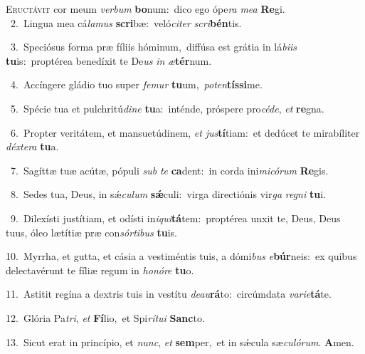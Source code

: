 \lettrine{\initial\textcolor{\initialcolor}{E}}{ructávit} cor meum \textit{ver}\-\textit{bum} \textbf{bo}\-num:~\star dico ego ópe\textit{ra} \textit{me}\-\textit{a} \textbf{Re}\-gi.\\
{\numbfont\textcolor{\numbcolor}{~2.}}~Lingua mea cá\-\textit{la}\-\textit{mus} \textbf{scri}\-bæ:~\star veló\-\textit{ci}\-\textit{ter} \textit{scri}\-\textbf{bén}tis.\par
{\numbfont\textcolor{\numbcolor}{~3.}}~Speciósus forma præ fíliis hóminum,~\dagger diffúsa est grátia in lá\-\textit{bi}\-\textit{is} \textbf{tu}\-is:~\star proptérea benedíxit te De\textit{us} \textit{in} \textit{æ}\-\textbf{tér}num.\par
{\numbfont\textcolor{\numbcolor}{~4.}}~Accíngere gládio tuo super \textit{fe}\-\textit{mur} \textbf{tu}\-um,~\star \textit{pot}\-\textit{en}\textbf{tís}\textbf{si}me.\par
{\numbfont\textcolor{\numbcolor}{~5.}}~Spécie tua et pulchritú\-\textit{di}\-\textit{ne} \textbf{tu}\-a:~\star inténde, próspere pro\-\textit{cé}\-\textit{de}, \textit{et} \textbf{re}\-gna.\par
{\numbfont\textcolor{\numbcolor}{~6.}}~Propter veritátem, et mansuetúdinem, \textit{et} \textit{jus}\-\textbf{tí}tiam:~\star et dedúcet te mirabíliter \textit{déx}\-\textit{te}\textit{ra} \textbf{tu}\-a.\par
{\numbfont\textcolor{\numbcolor}{~7.}}~Sagíttæ tuæ acútæ, pópuli \textit{sub} \textit{te} \textbf{ca}\-dent:~\star in corda ini\-\textit{mi}\-\textit{có}\textit{rum} \textbf{Re}\-gis.\par
{\numbfont\textcolor{\numbcolor}{~8.}}~Sedes tua, Deus, in sǽ\-\textit{cu}\-\textit{lum} \textbf{sǽ}\-culi:~\star virga directiónis vir\textit{ga} \textit{re}\-\textit{gni} \textbf{tu}\-i.\par
{\numbfont\textcolor{\numbcolor}{~9.}}~Dilexísti justítiam, et odísti in\-\textit{i}\-\textit{qui}\textbf{tá}tem:~\star proptérea unxit te, Deus, Deus tuus, óleo lætítiæ præ con\-\textit{sór}\-\textit{ti}\textit{bus} \textbf{tu}\-is.\par
{\numbfont\textcolor{\numbcolor}{10.}}~Myrrha, et gutta, et cásia a vestiméntis tuis, a dómi\textit{bus} \textit{e}\-\textbf{búr}neis:~\star ex quibus delectavérunt te fíliæ regum in \textit{ho}\-\textit{nó}\textit{re} \textbf{tu}\-o.\par
{\numbfont\textcolor{\numbcolor}{11.}}~Astitit regína a dextris tuis in vestítu \textit{de}\-\textit{au}\textbf{rá}to:~\star circúmdata \textit{va}\-\textit{ri}\textit{e}\textbf{tá}te.\par
{\numbfont\textcolor{\numbcolor}{12.}}~Glória Pa\-\textit{tri}\-, \textit{et} \textbf{Fí}\-lio,~\star et Spi\-\textit{rí}\-\textit{tu}\textit{i} \textbf{Sanc}\-to.\par
{\numbfont\textcolor{\numbcolor}{13.}}~Sicut erat in princípio, et \textit{nunc}\-, \textit{et} \textbf{sem}\-per,~\star et in sǽcula sæ\-\textit{cu}\-\textit{ló}\textit{rum}. \textbf{A}\-men.\par
